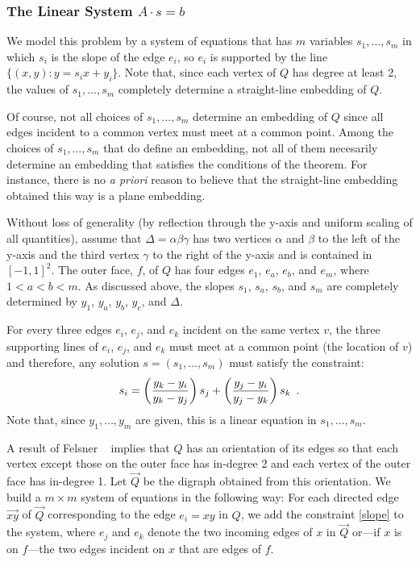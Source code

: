 \documentclass{patmorin}
\begin{document}
\subsubsection{The Linear System $A\cdot s=b$}

We model this problem by a system of equations that has $m$ variables
$s_1,\ldots,s_m$ in which $s_i$ is the slope of the edge $e_i$, so $e_i$
is supported by the line $\{(x,y):y=s_ix + y_i\}$.  Note that, since
each vertex of $Q$ has degree at least 2, the values of $s_1,\ldots,s_m$
completely determine a straight-line embedding of $Q$.

Of course, not all choices of $s_1,\ldots,s_m$ determine an embedding of
$Q$ since all edges incident to a common vertex must meet at a common point.
Among the choices of $s_1,\ldots,s_m$ that do define an embedding, not all
of them necesarily determine an embedding that satisfies the conditions
of the theorem. For instance, there is no \emph{a priori} reason to believe
that the straight-line embedding obtained this way is a plane embedding.

Without loss of generality (by reflection through the y-axis and uniform
scaling of all quantities), assume that $\Delta=\alpha\beta\gamma$
has two vertices $\alpha$ and $\beta$ to the left of the y-axis and
the third vertex $\gamma$ to the right of the y-axis and is contained
in $[-1,1]^2$.  The outer face, $f$, of $Q$ has four edges $e_1$, $e_a$,
$e_b$, and $e_m$, where $1 < a < b < m$.  As discussed above, the slopes
$s_1$, $s_a$, $s_b$, and $s_m$ are completely determined by $y_1$, $y_a$,
$y_b$, $y_c$, and $\Delta$.

For every three edges $e_i$, $e_j$, and $e_k$ incident on the same
vertex $v$, the three supporting lines of $e_i$, $e_j$, and $e_k$ must
meet at a common point (the location of $v$) and therefore, any solution
$s=(s_1,\ldots,s_m)$ must satisfy the constraint:
\begin{equation}\eqlabel{slope} 
    s_i = \left(\frac{y_k-y_i}{y_k-y_j}\right) s_j 
          + \left(\frac{y_j-y_i}{y_j-y_k}\right)s_k \enspace .
\end{equation}
Note that, since $y_1,\ldots,y_m$ are given, this is a linear equation
in $s_1,\ldots,s_m$.

A result of Felsner \etal\ \cite[Lemma~2.7]{felsner.huemer.ea:binary}
implies that $Q$ has an orientation of its edges so that each vertex
except those on the outer face has in-degree 2 and each vertex of
the outer face has in-degree 1.  Let $\vec{Q}$ be the digraph obtained
from this orientation. We build a $m\times m$ system of equations in
the following way: For each directed edge $\vec{xy}$ of $\vec{Q}$
corresponding to the edge $e_i=xy$ in $Q$, we add the constraint
\eqref{slope} to the system, where $e_j$ and $e_k$ denote the two incoming
edges of $x$ in $\vec{Q}$ or---if $x$ is on $f$---the two edges incident
on $x$ that are edges of $f$.
\end{document}
